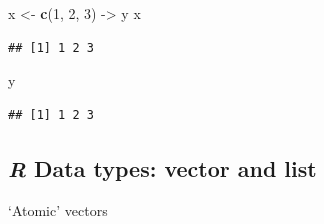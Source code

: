 \documentclass[]{article}
\newenvironment{Shaded}{\begin{snugshade}}{\end{snugshade}}
\newcommand{\KeywordTok}[1]{\textcolor[rgb]{0.13,0.29,0.53}{\textbf{#1}}}
\newcommand{\DecValTok}[1]{\textcolor[rgb]{0.00,0.00,0.81}{#1}}
\newcommand{\StringTok}[1]{\textcolor[rgb]{0.31,0.60,0.02}{#1}}
\newcommand{\NormalTok}[1]{#1}
\theoremstyle{definition}
\theoremstyle{definition}
\theoremstyle{remark}
\begin{document}
\begin{Shaded}
\begin{Highlighting}[]
\NormalTok{x <-}\StringTok{ }\KeywordTok{c}\NormalTok{(}\DecValTok{1}\NormalTok{, }\DecValTok{2}\NormalTok{, }\DecValTok{3}\NormalTok{) ->}\StringTok{ }\NormalTok{y}
\NormalTok{x}
\end{Highlighting}
\end{Shaded}

\begin{verbatim}
## [1] 1 2 3
\end{verbatim}

\begin{Shaded}
\begin{Highlighting}[]
\NormalTok{y}
\end{Highlighting}
\end{Shaded}

\begin{verbatim}
## [1] 1 2 3
\end{verbatim}

\subsection{\texorpdfstring{\emph{R} Data types: vector and
list}{R Data types: vector and list}}\label{r-data-types-vector-and-list}

`Atomic' vectors
\end{document}
